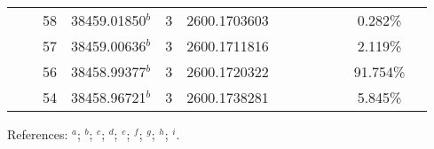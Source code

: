 \begin{table*}
\begin{center}
{\begin{tabular}{:l;l;c;l;c;l;c;l;l;c;c;c;c}
\rowstyle{\itshape}               &        & 58        & 38459.01850$^{b}$                & 3 &  2600.1703603      &      & $                                        $ & $                                        $ &             &              & 0.282\%   & $     ^{}     $\\
\rowstyle{\itshape}               &        & 57        & 38459.00636$^{b}$                & 3 &  2600.1711816      &      & $                                        $ & $                                        $ &             &              & 2.119\%   & $     ^{}     $\\
\rowstyle{\itshape}               &        & 56        & 38458.99377$^{b}$                & 3 &  2600.1720322      &      & $                                        $ & $                                        $ &             &              & 91.754\%  & $     ^{}     $\\
\rowstyle{\itshape}               &        & 54        & 38458.96721$^{b}$                & 3 &  2600.1738281      &      & $                                        $ & $                                        $ &             &              & 5.845\%   & $     ^{}     $\\
\hline
\end{tabular}
}
{\footnotesize References:
$^{a}$\citet{Nave:1994:221;Nave:2011:737};
$^{b}$\citet{Porsev:2009:032519};
$^{c}$\citet{Nave:1994:221;Nave:2011:737. No known Gamma value.};
$^{d}$\citet{Krins:2009:062508};
$^{e}$\citet{Childs:1966:74};
$^{f}$\citet{Nave:2012:1570};
$^{g}$\citet{Dzuba:2002:022501};
$^{h}$\citet{Berengut:2006:PhD};
$^{i}$\citet{Aldenius:2009:014008}.}
\end{center}
\end{table*}
